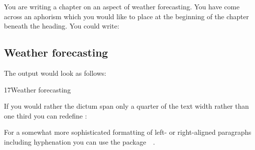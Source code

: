 \begin{Example}
  You are writing a chapter on an aspect of weather forecasting. You
  have come across an aphorism which you would like to place at the
  beginning of the chapter beneath the heading. You could write:
\begin{lstcode}
  \chapter{Weather forecasting}
\end{lstcode}
  The output would look as follows:
  \begin{ShowOutput}
    {%
      17\enskip Weather forecasting\par} \vspace{\baselineskip}
  \end{ShowOutput}

  If you would rather the dictum span only a quarter of the text width
  rather than one third you can redefine :
\begin{lstcode}
  \renewcommand*{\dictumwidth}{.25\textwidth}
\end{lstcode}
\end{Example}

For a somewhat more sophisticated formatting of left- or right-aligned
paragraphs including hyphenation you can use the
package~~\cite{package:ragged2e}.%
\fi
%
\EndIndexGroup
%
\fi  %
%
\EndIndexGroup


